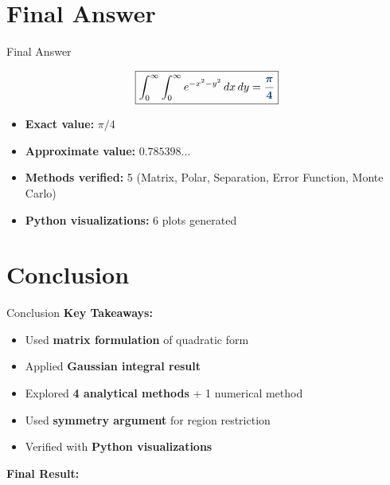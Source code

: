 \documentclass[12pt, aspectratio=169]{beamer}
\newcommand{\res}[1]{\textcolor{madblue}{\bm{#1}}}
\begin{document}
\section{Final Answer}

\begin{frame}{Final Answer}
\begin{center}
\LARGE
\[
\boxed{
\int_0^\infty \int_0^\infty e^{-x^2 - y^2} \, dx\,dy
= \res{\frac{\pi}{4}}
}
\]
\end{center}

\vspace{0.5cm}

\begin{itemize}
    \item \textbf{Exact value:} $\pi/4$
    \item \textbf{Approximate value:} $0.785398...$
    \item \textbf{Methods verified:} 5 (Matrix, Polar, Separation, Error Function, Monte Carlo)
    \item \textbf{Python visualizations:} 6 plots generated
\end{itemize}
\end{frame}


\section{Conclusion}

\begin{frame}{Conclusion}
\textbf{Key Takeaways:}
\begin{itemize}
    \item Used \textbf{matrix formulation} of quadratic form
    \item Applied \textbf{Gaussian integral result}
    \item Explored \textbf{4 analytical methods} + 1 numerical method
    \item Used \textbf{symmetry argument} for region restriction
    \item Verified with \textbf{Python visualizations}
\end{itemize}

\vspace{0.4cm}

\begin{center}
\textbf{Final Result: } \res{$\displaystyle \frac{\pi}{4}$}
\end{center}
\end{frame}
\end{document}
